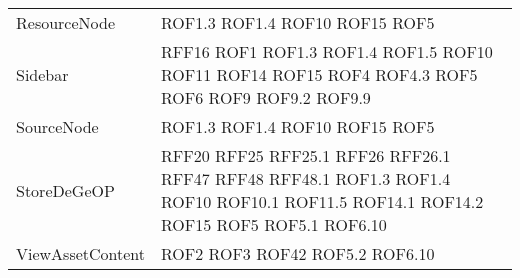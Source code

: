 \begin{longtable}{p{5cm}!{\VRule[1pt]}p{2.5cm}}
	ResourceNode & ROF1.3 \newline ROF1.4 \newline ROF10 \newline ROF15 \newline ROF5\\
	Sidebar & RFF16 \newline ROF1 \newline ROF1.3 \newline ROF1.4 \newline ROF1.5 \newline ROF10 \newline ROF11 \newline ROF14 \newline ROF15 \newline ROF4 \newline ROF4.3 \newline ROF5 \newline ROF6 \newline ROF9 \newline ROF9.2 \newline ROF9.9\\
	SourceNode & ROF1.3 \newline ROF1.4 \newline ROF10 \newline ROF15 \newline ROF5\\
	StoreDeGeOP & RFF20 \newline RFF25 \newline RFF25.1 \newline RFF26 \newline RFF26.1 \newline RFF47 \newline RFF48 \newline RFF48.1 \newline ROF1.3 \newline ROF1.4 \newline ROF10 \newline ROF10.1 \newline ROF11.5 \newline ROF14.1 \newline ROF14.2 \newline ROF15 \newline ROF5 \newline ROF5.1 \newline ROF6.10\\
	ViewAssetContent & ROF2 \newline ROF3 \newline ROF42 \newline ROF5.2 \newline ROF6.10\\

\end{longtable}
